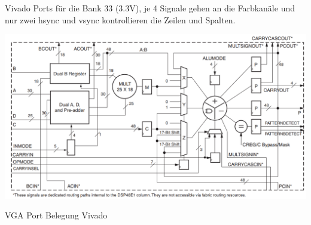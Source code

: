 Vivado Ports für die Bank 33 (3.3V), je 4 Signale gehen an die Farbkanäle und nur zwei hsync und vsync kontrollieren 
die Zeilen und Spalten.\\

\begin{minipage}{\textwidth}
    \begin{center}
        \includegraphics[scale=0.6]{img/DSP48e.png} 
    \end{center}
\end{minipage}
\begin{center}
VGA Port Belegung Vivado
\end{center}


